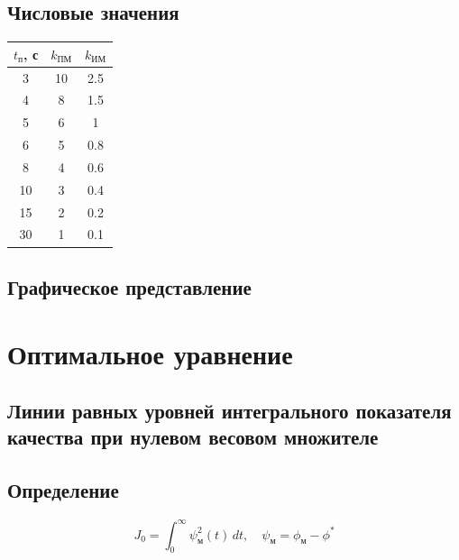 \documentclass[14pt]{extreport}
\begin{document}
{\subsection*{Числовые значения}
\begin{table}[h]
\centering
\begin{tabular}{|c|c|c|}
\hline
$t_{\text{п}}$, с & $k_{\text{ПМ}}$ & $k_{\text{ИМ}}$ \\
\hline
3 & 10 & 2.5 \\
4 & 8 & 1.5 \\
5 & 6 & 1 \\
6 & 5 & 0.8 \\
8 & 4 & 0.6 \\
10 & 3 & 0.4 \\
15 & 2 & 0.2 \\
30 & 1 & 0.1 \\
\hline
\end{tabular}
\end{table}

\subsection*{Графическое представление}
\begin{center}
\end{center}

        \newpage
        

        \section{Оптимальное уравнение}

        \subsection{Линии равных уровней интегрального показателя качества при нулевом весовом множителе}
        \subsection*{Определение}
\[
J_0 = \int_{0}^{\infty} \psi_{\text{м}}^2(t) \, dt, \quad \psi_{\text{м}} = \phi_{\text{м}} - \phi^*
\]

}
\end{document}
